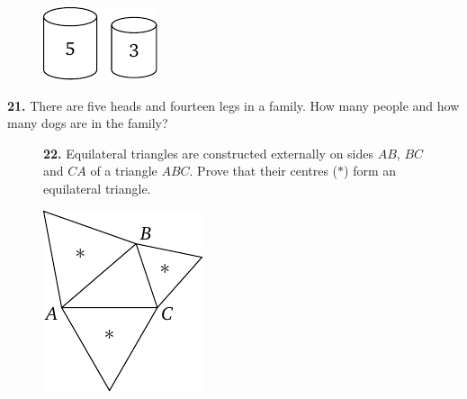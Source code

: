 \documentclass[12pt]{article}  %
\begin{document}
\begin{figure}[h!]
\centering
\footnotesize
\includegraphics[scale=1]{taskbook-4}
\end{figure}

\medskip\noindent
{\bf 21.} There are five heads and fourteen legs in a family. How many people and how many dogs are in the family?
\begin{figure}[h!]
\begin{minipage}[c][][c]{0.7 \textwidth}
{\bf 22.} Equilateral triangles are constructed externally on sides $AB$, $BC$ and $CA$ of a triangle $ABC$.
Prove that their centres ($*$) form an equilateral triangle.\end{minipage}
\hfill
\begin{minipage}[c]{0.2 \textwidth}
\includegraphics[scale=1]{taskbook-6}
\end{minipage}
\end{figure}

\end{document}
